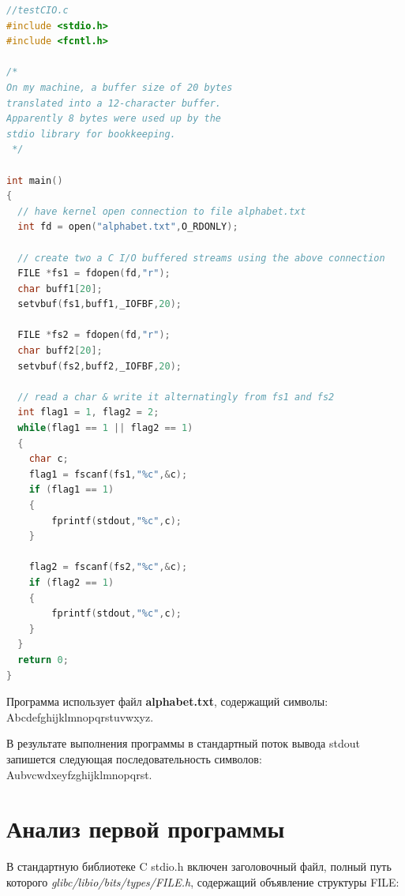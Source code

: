 \documentclass[12pt]{report}
\begin{document}
\begin{lstlisting}[language=C]
//testCIO.c
#include <stdio.h>
#include <fcntl.h>

/*
On my machine, a buffer size of 20 bytes
translated into a 12-character buffer.
Apparently 8 bytes were used up by the
stdio library for bookkeeping.
 */

int main()
{
  // have kernel open connection to file alphabet.txt
  int fd = open("alphabet.txt",O_RDONLY);

  // create two a C I/O buffered streams using the above connection
  FILE *fs1 = fdopen(fd,"r");
  char buff1[20];
  setvbuf(fs1,buff1,_IOFBF,20);

  FILE *fs2 = fdopen(fd,"r");
  char buff2[20];
  setvbuf(fs2,buff2,_IOFBF,20);
  
  // read a char & write it alternatingly from fs1 and fs2
  int flag1 = 1, flag2 = 2;
  while(flag1 == 1 || flag2 == 1)
  {
    char c;
    flag1 = fscanf(fs1,"%c",&c);
    if (flag1 == 1)
    {
        fprintf(stdout,"%c",c);
    }
    
    flag2 = fscanf(fs2,"%c",&c);
    if (flag2 == 1)
    {
        fprintf(stdout,"%c",c);
    }
  }
  return 0;
}
\end{lstlisting}

Программа использует файл \textbf{alphabet.txt}, содержащий символы: Abcdefghijklmnopqrstuvwxyz.

В результате выполнения программы в стандартный поток вывода stdout запишется следующая последовательность символов:  Aubvcwdxeyfzghijklmnopqrst.

\section{Анализ первой программы}

В стандартную библиотеке C stdio.h включен заголовочный файл, полный путь которого \textit{glibc/libio/bits/types/FILE.h}, содержащий объявление структуры FILE:
\end{document}
